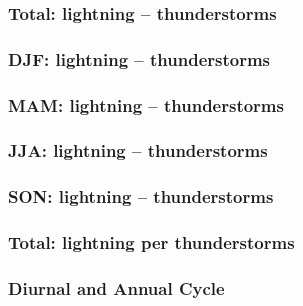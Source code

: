 \documentclass[smaller]{beamer}
\begin{document}
\begin{frame}
\frametitle{Total: lightning -- thunderstorms}

\end{frame}


\begin{frame}
\frametitle{DJF: lightning -- thunderstorms}

\end{frame}

\begin{frame}
\frametitle{MAM: lightning -- thunderstorms}

\end{frame}

\begin{frame}
\frametitle{JJA: lightning -- thunderstorms}

\end{frame}

\begin{frame}
\frametitle{SON: lightning -- thunderstorms}

\end{frame}


\begin{frame}
\frametitle{Total: lightning per thunderstorms}

\end{frame}


\begin{frame}
\frametitle{Diurnal and Annual Cycle}

\end{frame} 


\begin{frame}
\frametitle{}

\end{frame}


\begin{frame}
\frametitle{}

\end{frame}
\end{document}
